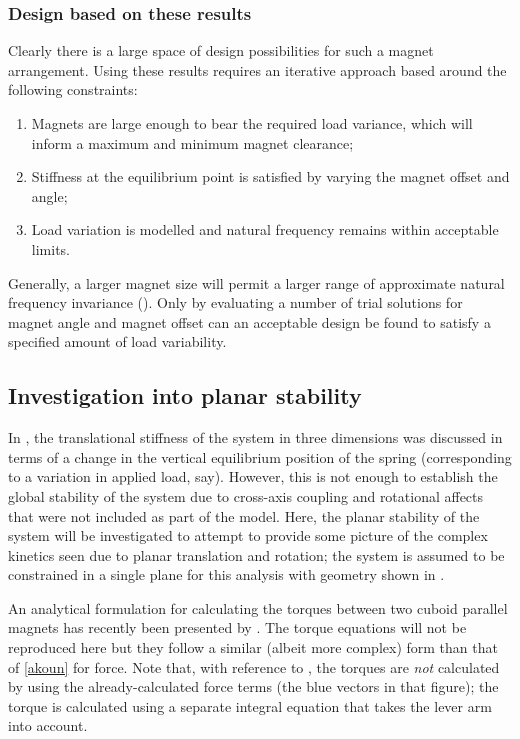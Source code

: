 \subsubsection{Design based on these results}

Clearly there is a large space of design possibilities for such a magnet arrangement.
Using these results requires an iterative approach based around the following constraints:
\begin{enumerate}
\item Magnets are large enough to bear the required load variance, which will inform a maximum and minimum magnet clearance;
\item Stiffness at the equilibrium point is satisfied by varying the magnet offset and angle;
\item Load variation is modelled and natural frequency remains within acceptable limits.
\end{enumerate}
Generally, a larger magnet size will permit a larger range of approximate natural frequency invariance ().
Only by evaluating a number of trial solutions for magnet angle and magnet offset can an acceptable design be found to satisfy a specified amount of load variability.



\subsection{Investigation into planar stability}

In , the translational stiffness of the system in three dimensions was discussed in terms of a change in the vertical equilibrium position of the spring (corresponding to a variation in applied load, say).
However, this is not enough to establish the global stability of the system due to cross-axis coupling and rotational affects that were not included as part of the model.
Here, the planar stability of the system will be investigated to attempt to provide some picture of the complex kinetics seen due to planar translation and rotation; the system is assumed to be constrained in a single plane for this analysis with geometry shown in .

An analytical formulation for calculating the torques between two cuboid parallel magnets has recently been presented by \textcite{janssen2010-ietm}.
The torque equations will not be reproduced here but they follow a similar (albeit more complex) form than that of \eqref{akoun} for force.
Note that, with reference to , the torques are \emph{not} calculated by using the already-calculated force terms (the blue vectors in that figure); the torque is calculated using a separate integral equation that takes the lever arm into account.

